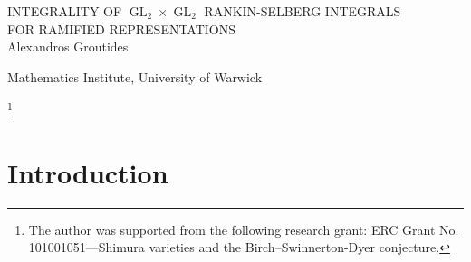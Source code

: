 \documentclass{amsart}
\date{} %
\theoremstyle{plain}
\theoremstyle{plain}
\theoremstyle{remark}
\DeclareMathOperator{\GL}{GL}
\newcommand\blfootnote[1]{%
  \begingroup
  \renewcommand\thefootnote{}\footnote{#1}%
  \addtocounter{footnote}{-1}%
  \endgroup
}
\begin{document}
\hypersetup{citecolor=blue}
\hypersetup{linkcolor=red}

\begin{center}
  \LARGE 
 INTEGRALITY OF $\GL_2\times\GL_2$ RANKIN-SELBERG INTEGRALS\\ FOR RAMIFIED REPRESENTATIONS
  \normalsize
  \\
  \bigskip
  Alexandros Groutides \par 

  Mathematics Institute, University of Warwick\par
\end{center}

\begin{abstract}
    \textcolor{black}{Let $\pi_1,\pi_2$ be irreducible admissible generic tempered representations of $\mathrm{GL}_2(F)$ for some finite extension $F/\mathbf{Q}_p$ of odd residue characteristic. Inspired by work of Loeffler and previous work of the author on unramified zeta-integrals, we introduce a natural general notion of $(\pi_1\times\pi_2)$-\textit{integral} data at which the 
 Rankin-Selberg zeta-integral can be evaluated. We then establish an integral refinement of Jacquet-Langland's GCD-result for this zeta-integral, when evaluated at $(\pi_1\times\pi_2)$-integral data. This is compatible with the notion of integrality coming from the Fourier coefficients of newforms of even integral weights. Our approach relies on a reinterpretation of the Rankin-Selberg zeta-integral, and works of Assing and Saha on values of $p$-adic Whittaker new vectors.}
\end{abstract}
\blfootnote{The author was supported from the following research grant: ERC Grant No. 101001051—Shimura varieties and the Birch–Swinnerton-Dyer conjecture.}
\vspace{-2em}
\section{Introduction}
\end{document}
